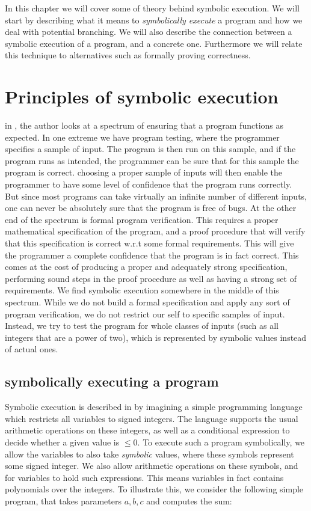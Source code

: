 In this chapter we will cover some of theory behind symbolic execution. We will start by describing what it means to \emph{symbolically execute} a program and how we deal with potential branching. We will also describe the connection between a symbolic execution of a program, and a concrete one. Furthermore we will relate this technique to alternatives such as formally proving correctness. 

\section{Principles of symbolic execution }
	in \cite{king76}, the author looks at a spectrum of ensuring that a program functions as expected. In one extreme we have program testing, where the programmer specifies a sample of input. The program is then run on this sample, and if the program runs as intended, the programmer can be sure that for this sample the program is correct. choosing a proper sample of inputs will then enable the programmer to have some level of confidence that the program runs correctly. But since most programs can take virtually an infinite number of different inputs, one can never be absolutely sure that the program is free of bugs. At the other end of the spectrum is formal program verification. 
	This requires a proper mathematical specification of the program, and a proof procedure that will verify that this specification is correct w.r.t some formal requirements. 
	This will give the programmer a complete confidence that the program is in fact correct. This comes at the cost of producing a proper and adequately strong specification, performing sound steps in the proof procedure as well as having a strong set of requirements. 
	We find symbolic execution somewhere in the middle of this spectrum. While we do not build a formal specification and apply any sort of program verification, we do not restrict our self to specific samples of input. Instead, we try to test the program for whole classes of inputs (such as all integers that are a power of two), which is represented by symbolic values instead of actual ones.

\subsection{symbolically executing a program}
	
	Symbolic execution is described in \cite{King76} by imagining a simple programming language which restricts all variables to signed integers. The language supports the usual arithmetic operations on these integers, as well as a conditional expression to decide whether a given value is $ \leq 0$. To execute such a program symbolically, we allow the variables to also take \emph{symbolic} values, where these symbols represent some signed integer. We also allow arithmetic operations on these symbols, and for variables to hold such expressions. This means variables in fact contains polynomials over the integers.
	To illustrate this, we consider the following simple program, that takes parameters $a, b, c$ and computes the sum:
	
